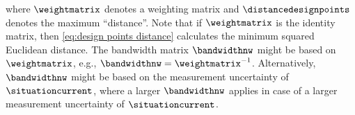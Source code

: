 where $\weightmatrix$ denotes a weighting matrix and $\distancedesignpoints$ denotes the maximum ``distance''. 
Note that if $\weightmatrix$ is the identity matrix, then \cref{eq:design points distance} calculates the minimum squared Euclidean distance.
The bandwidth matrix $\bandwidthnw$ might be based on $\weightmatrix$, e.g., $\bandwidthnw=\weightmatrix^{-1}$.
Alternatively, $\bandwidthnw$ might be based on the measurement uncertainty of $\situationcurrent$, where a larger $\bandwidthnw$ applies in case of a larger measurement uncertainty of $\situationcurrent$.


